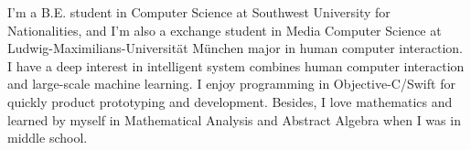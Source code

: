 
\begin{cventries}
  \cventry
    {}
    {}
    {}
    {}
    {
    I'm a B.E. student in Computer Science at Southwest University for Nationalities, and I'm also a exchange student in Media Computer Science at Ludwig-Maximilians-Universität München major in human computer interaction.
    I have a deep interest in intelligent system combines human computer interaction and large-scale machine learning. I enjoy programming in Objective-C/Swift for quickly product prototyping and development. Besides, I love mathematics and learned by myself in Mathematical Analysis and Abstract Algebra when I was in middle school.
    }
\end{cventries}
